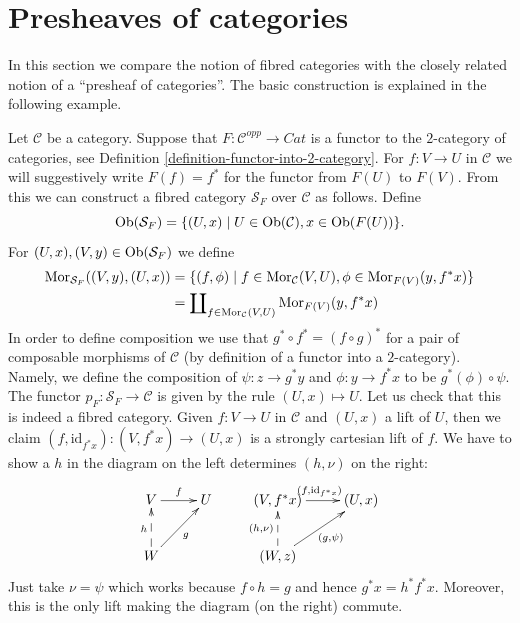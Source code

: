 \section{Presheaves of categories}
\label{section-presheaves-categories}

\noindent
In this section we compare the notion of fibred categories
with the closely related notion of a ``presheaf of categories''.
The basic construction is explained in the following example.

\begin{example}
\label{example-functor-categories}
Let $\mathcal{C}$ be a category.
Suppose that $F : \mathcal{C}^{opp} \to \textit{Cat}$ is a functor
to the $2$-category of categories, see
Definition \ref{definition-functor-into-2-category}.
For $f : V \to U$ in $\mathcal{C}$ we will
suggestively write $F(f) = f^\ast$ for the functor from $F(U)$ to $F(V)$.
From this we can construct a fibred category $\mathcal{S}_F$ over
$\mathcal{C}$ as follows. Define
$$
\mathop{\mathrm{Ob}}\nolimits(\mathcal{S}_F) =
\{(U, x) \mid U\in \mathop{\mathrm{Ob}}\nolimits(\mathcal{C}), x\in \mathop{\mathrm{Ob}}\nolimits(F(U))\}.
$$
For $(U, x), (V, y) \in \mathop{\mathrm{Ob}}\nolimits(\mathcal{S}_F)$ we define
\begin{align*}
\mathop{\mathrm{Mor}}\nolimits_{\mathcal{S}_F}((V, y), (U, x)) & =
\{ (f, \phi) \mid f \in \mathop{\mathrm{Mor}}\nolimits_\mathcal{C}(V, U),
\phi \in \mathop{\mathrm{Mor}}\nolimits_{F(V)}(y, f^\ast x)\} \\
& =
\coprod\nolimits_{f \in \mathop{\mathrm{Mor}}\nolimits_\mathcal{C}(V, U)}
\mathop{\mathrm{Mor}}\nolimits_{F(V)}(y, f^\ast x)
\end{align*}
In order to define composition we use that $g^\ast \circ f^\ast =
(f \circ g)^\ast$ for a pair of composable morphisms of $\mathcal{C}$
(by definition of a functor into a $2$-category).
Namely, we define the composition of $\psi : z \to g^\ast y$ and
$ \phi : y \to f^\ast x$ to be $ g^\ast(\phi) \circ \psi$. The functor
$p_F : \mathcal{S}_F \to \mathcal{C}$ is given by the rule
$(U, x) \mapsto U$.
Let us check that this is indeed a fibred category.
Given $f: V \to U$ in $\mathcal{C}$ and $(U, x)$ a lift of $U$, then
we claim $(f, \text{id}_{f^\ast x}): (V, {f^\ast x}) \to (U, x)$ is a
strongly cartesian lift of $f$.
We have to show a $h$ in the diagram on the left
determines $(h, \nu)$ on the right:
$$
\xymatrix{
V \ar[r]^f &
U &
(V, f^*x) \ar[r]^{(f, \text{id}_{f^*x})} &
(U, x) \\
W \ar@{-->}[u]^h \ar[ru]_g & &
(W, z) \ar@{-->}[u]^{(h, \nu)} \ar[ru]_{(g, \psi)} &
}
$$
Just take $\nu = \psi$ which works because $f \circ h = g$
and hence $g^*x = h^*f^*x$. Moreover, this is the only lift
making the diagram (on the right) commute.
\end{example}

